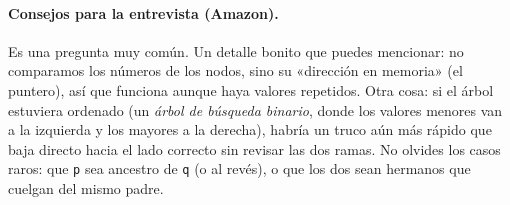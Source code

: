 \paragraph{Consejos para la entrevista (Amazon).} Es una pregunta muy común.
Un detalle bonito que puedes mencionar: no comparamos los números de los nodos,
sino su «dirección en memoria» (el puntero), así que funciona aunque haya
valores repetidos. Otra cosa: si el árbol estuviera ordenado (un \emph{árbol de
búsqueda binario}, donde los valores menores van a la izquierda y los mayores a
la derecha), habría un truco aún más rápido que baja directo hacia el lado
correcto sin revisar las dos ramas. No olvides los casos raros: que \texttt{p}
sea ancestro de \texttt{q} (o al revés), o que los dos sean hermanos que
cuelgan del mismo padre.
